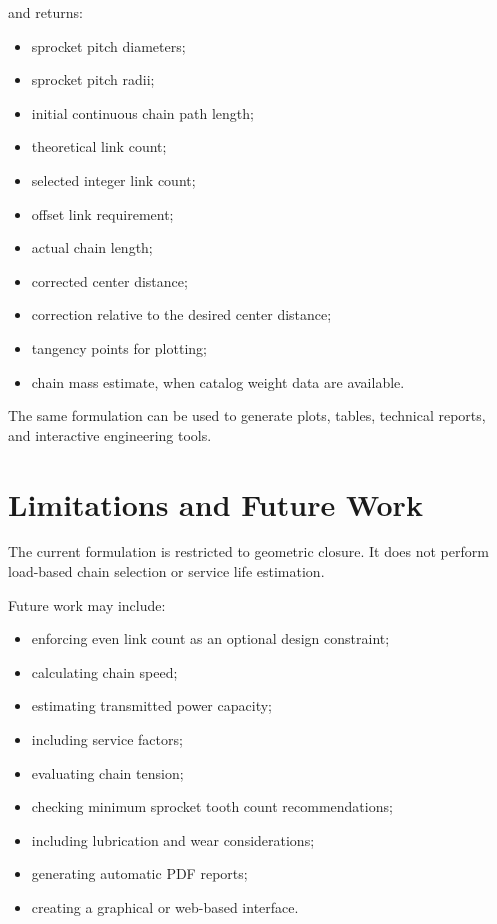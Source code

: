 \documentclass[11pt,a4paper]{article}
\begin{document}
and returns:

\begin{itemize}
    \item sprocket pitch diameters;
    \item sprocket pitch radii;
    \item initial continuous chain path length;
    \item theoretical link count;
    \item selected integer link count;
    \item offset link requirement;
    \item actual chain length;
    \item corrected center distance;
    \item correction relative to the desired center distance;
    \item tangency points for plotting;
    \item chain mass estimate, when catalog weight data are available.
\end{itemize}

The same formulation can be used to generate plots, tables, technical reports, and interactive engineering tools.

\section{Limitations and Future Work}

The current formulation is restricted to geometric closure. It does not perform load-based chain selection or service life estimation.

Future work may include:

\begin{itemize}
    \item enforcing even link count as an optional design constraint;
    \item calculating chain speed;
    \item estimating transmitted power capacity;
    \item including service factors;
    \item evaluating chain tension;
    \item checking minimum sprocket tooth count recommendations;
    \item including lubrication and wear considerations;
    \item generating automatic PDF reports;
    \item creating a graphical or web-based interface.
\end{itemize}
\end{document}

